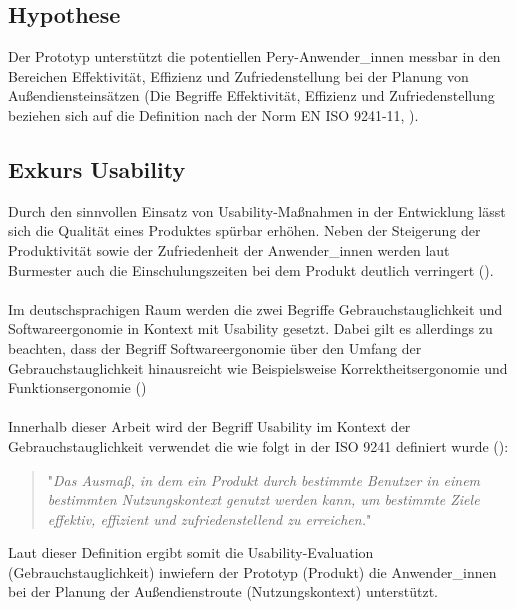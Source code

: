 \documentclass[Bachelorarbeit.tex]{subfiles}
\begin{document}
\subsection{Hypothese}
\label{Hypothese}

Der Prototyp unterstützt die potentiellen Pery-Anwender\_innen messbar in den Bereichen Effektivität, Effizienz und Zufriedenstellung bei der Planung von Außendiensteinsätzen (Die Begriffe Effektivität, Effizienz und Zufriedenstellung beziehen sich auf die Definition nach der Norm EN ISO 9241-11, \cite[vgl.][Abs.: 3]{Iso9241_11}).


\subsection{Exkurs Usability}  
\label{Usability}
Durch den sinnvollen Einsatz von Usability-Maßnahmen in der Entwicklung lässt sich die Qualität eines Produktes spürbar erhöhen.
Neben der Steigerung der Produktivität sowie der Zufriedenheit der Anwender\_innen werden laut Burmester auch die Einschulungszeiten bei dem Produkt deutlich verringert (\cite[vgl.][352f]{Burmester}).\\
\\
Im deutschsprachigen Raum werden die zwei Begriffe Gebrauchstauglichkeit und Softwareergonomie in Kontext mit Usability gesetzt.
Dabei gilt es allerdings zu beachten, dass der Begriff Softwareergonomie über den Umfang der Gebrauchstauglichkeit hinausreicht wie Beispielsweise Korrektheitsergonomie und Funktionsergonomie
(\cite[vgl.][420]{Niegemann2008})\\
\\
Innerhalb dieser Arbeit wird der Begriff Usability im Kontext der Gebrauchstauglichkeit verwendet die wie folgt in der ISO 9241 definiert wurde (\cite[siehe:][Abs.: 3.1 Gebrauchstauglichkeit]{Iso9241_11}):

\begin{quote}
	"\textit{Das Ausmaß, in dem ein Produkt durch bestimmte Benutzer in einem bestimmten Nutzungskontext genutzt werden kann, um bestimmte Ziele effektiv, effizient und zufriedenstellend zu erreichen.}" 
\end{quote}

Laut dieser Definition ergibt somit die Usability-Evaluation (Gebrauchstauglichkeit) inwiefern der Prototyp (Produkt) die Anwender\_innen bei der Planung der Außendienstroute (Nutzungskontext) unterstützt.
\end{document}
